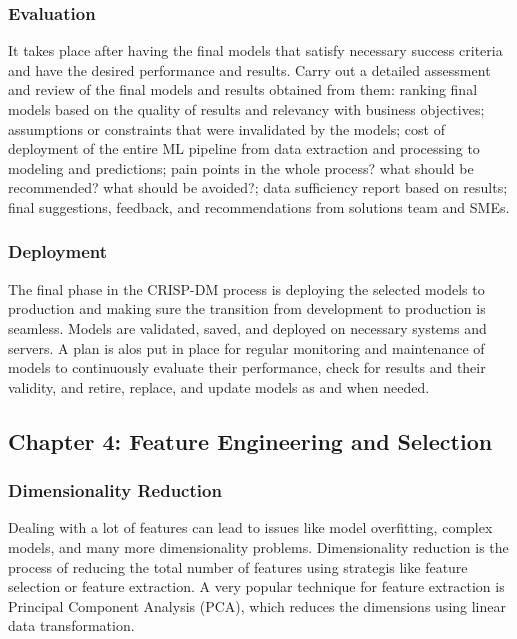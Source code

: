 \hypertarget{evaluation}{%
\subsubsection{Evaluation}\label{evaluation}}

It takes place after having the final models that satisfy necessary
success criteria and have the desired performance and results. Carry out
a detailed assessment and review of the final models and results
obtained from them: ranking final models based on the quality of results
and relevancy with business objectives; assumptions or constraints that
were invalidated by the models; cost of deployment of the entire ML
pipeline from data extraction and processing to modeling and
predictions; pain points in the whole process? what should be
recommended? what should be avoided?; data sufficiency report based on
results; final suggestions, feedback, and recommendations from solutions
team and SMEs.

\hypertarget{deployment}{%
\subsubsection{Deployment}\label{deployment}}

The final phase in the CRISP-DM process is deploying the selected models
to production and making sure the transition from development to
production is seamless. Models are validated, saved, and deployed on
necessary systems and servers. A plan is alos put in place for regular
monitoring and maintenance of models to continuously evaluate their
performance, check for results and their validity, and retire, replace,
and update models as and when needed.

\hypertarget{chapter-4-feature-engineering-and-selection}{%
\subsection{Chapter 4: Feature Engineering and
Selection}\label{chapter-4-feature-engineering-and-selection}}

\hypertarget{dimensionality-reduction}{%
\subsubsection{Dimensionality
Reduction}\label{dimensionality-reduction}}

Dealing with a lot of features can lead to issues like model
overfitting, complex models, and many more dimensionality problems.
Dimensionality reduction is the process of reducing the total number of
features using strategis like feature selection or feature extraction. A
very popular technique for feature extraction is Principal Component
Analysis (PCA), which reduces the dimensions using linear data
transformation.


